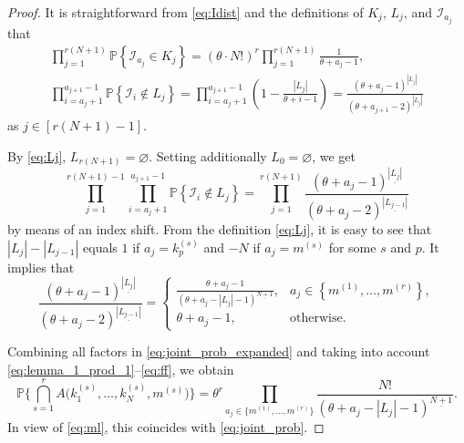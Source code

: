 \documentclass[11pt]{article}
\newcommand{\hs}{\hspace{1pt}}
\renewcommand{\P}[1]{\mathbb{P}{\left\{#1\right\}}}
\newcommand{\1}[1][]{
	\ifx&#1&\mathds{1}
	\else\mathds{1}\left\{#1\right\}\fi}
\newcommand{\Ic}{\mathcal{I}}
\theoremstyle{definition}
\theoremstyle{remark}
\numberwithin{equation}{section}
\begin{document}
\begin{proof}
		It is straightforward from \eqref{eq:Idist} and the definitions of $K_j$, $L_j$, and $\Ic_{a_j}$ that
		\begin{gather}
			\label{eq:lemma_1_prod_1}
			\prod_{j=1}^{r(N+1)}\P{\Ic_{a_j} \in K_j}= 
			(\theta \cdot N!)^r \prod_{j=1}^{r(N+1)} \frac{1}{\theta + a_j - 1}, \\
			\prod_{i={a_j + 1}}^{a_{j+1} - 1} \P{\Ic_i \notin L_j}=
			\prod_{i={a_j + 1}}^{a_{j+1}-1} \left(
			1 - \frac{|L_j|}{\theta + i - 1}\right) = 
			\frac{(\theta + a_j - 1)^{\underline{|L_j|}}}{(\theta + a_{j+1} - 2)^{\underline{|L_j|}}}
		\end{gather}
		as $j\in[r(N+1)-1]$.

		By \eqref{eq:Lj}, $L_{r(N+1)} = \varnothing$. Setting additionally $L_0 = \varnothing$, we get
		\begin{equation}
			\prod_{j=1}^{r(N+1)-1} \prod_{i={a_j + 1}}^{a_{j+1} - 1} \P{\Ic_i \notin L_j} = 
			\!\!\prod_{j=1}^{r(N+1)} \frac{(\theta + a_j - 1)^{\underline{|L_j|}}}{(\theta + a_j - 2)^{\underline{|L_{j-1}|}}}
		\end{equation}
		by means of an index shift.        
		From the definition \eqref{eq:Lj}, it is easy to see that $|L_j|-|L_{j-1}|$ equals $1$ if $a_j=k_p^{(s)}$ and $-N$ if $a_j=m^{(s)}$ for some $s$ and $p$.
		It implies that
		\begin{equation}
			\label{eq:ff}
			\frac{(\theta + a_j - 1)^{\underline{|L_j|}}}{(\theta + a_j - 2)^{\underline{|L_{j-1}|}}} = 
			\begin{cases}
				\frac{\theta + a_j - 1}{\left(\theta + a_j - |L_j| - 1\right)^{\underline{N+1}}}, & a_j \in \left\{m^{(1)}, \dots, m^{(r)}\right\}, \\
				\theta + a_j - 1, & \text{otherwise}.
			\end{cases}
		\end{equation}        
		
		Combining all factors in \eqref{eq:joint_prob_expanded} and taking into account \eqref{eq:lemma_1_prod_1}\hs--\hs\eqref{eq:ff}, we obtain
		\begin{equation*}
			\mathbb{P}\biggl\{\bigcap_{s=1}^r A\bigl(k_1^{(s)}, \dots, k_N^{(s)}, m^{(s)}\bigr)\biggr\} = 
			\theta^r \!\!\prod_{a_j\in\{m^{(1)}, \dots, m^{(r)}\}}\frac{N!}{\left(\theta + a_j - |L_j| - 1\right)^{\underline{N+1}}}.
		\end{equation*}
		In view of \eqref{eq:ml}, this coincides with \eqref{eq:joint_prob}.
	\end{proof}
	
\end{document}

